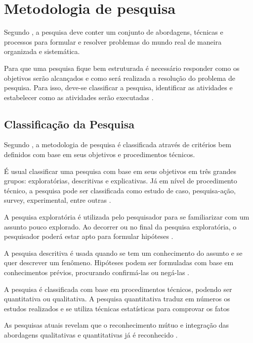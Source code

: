  \chapter{Metodologia de pesquisa}

Segundo , a pesquisa deve conter um conjunto de abordagens, técnicas e processos para formular e resolver problemas do mundo real de maneira organizada e sistemática.

Para que uma pesquisa fique bem estruturada é necessário responder como os objetivos serão alcançados e  como será realizada a resolução do problema de pesquisa. Para isso, deve-se classificar a pesquisa, identificar as atividades e estabelecer como as atividades serão executadas \cite{forcon2014}.

\section{Classificação da Pesquisa}

Segundo , a metodologia de pesquisa é classificada através de critérios bem definidos com base em seus objetivos e procedimentos técnicos.

É usual classificar uma pesquisa com base em seus objetivos em três grandes grupos: exploratórias, descritivas e explicativas. Já em nível de procedimento técnico, a pesquisa pode ser classificada como estudo de caso, pesquisa-ação, survey, experimental, entre outras \cite[pág.~41]{gil2008}.

A pesquisa exploratória é utilizada pelo pesquisador para se familiarizar com um assunto pouco explorado. Ao decorrer ou no final da pesquisa exploratória, o pesquisador poderá estar apto para formular hipóteses \cite{giudice}.

A pesquisa descritiva é usada quando se tem um conhecimento do assunto e se quer descrever um fenômeno. Hipóteses podem ser formuladas com base em conhecimentos prévios, procurando confirmá-las ou negá-las \cite[pág.~21]{fonseca2002}.

A pesquisa é classificada com base em procedimentos técnicos, podendo ser quantitativa ou qualitativa. A pesquisa quantitativa traduz em números os estudos realizados e se utiliza técnicas estatísticas para comprovar os fatos \cite[pág.~9]{rodrigues2007}


As pesquisas atuais revelam que o reconhecimento mútuo e integração das abordagens qualitativas e quantitativas já é reconhecido \cite{serapioni}.


